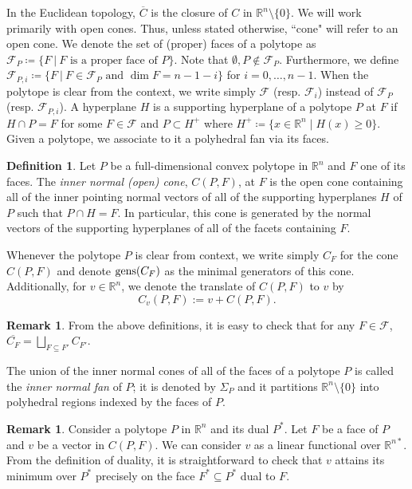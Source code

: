 \documentclass{article}
\numberwithin{theorem}{section}
\theoremstyle{definition}
\newtheorem{definition}[theorem]{Definition}
\newtheorem{remark}[theorem]{Remark}
\theoremstyle{example_contd}
\newcommand{\F}{\mathcal{F}}
\newcommand{\RR}{\mathbb{R}}
\newcommand{\Rd}{\mathbb{R}^{n*}}
\begin{document}
	In the Euclidean topology, $\overline{C}$ is the closure of $C$ in $\RR^n\setminus \{0\}$. 
    We will work primarily with open cones. Thus, unless stated otherwise, ``cone" will refer to an open cone.
    We denote the set of (proper) faces of a polytope as $\F_P\coloneqq \{F~|~ F \text{ is a proper face of }P\}$. Note that $\emptyset, P \notin \F_P$. Furthermore, we define $\F_{P,i}\coloneqq \{F~|~ F \in \F_P \text{ and } \dim F= n-1-i\}$ for $i=0,\ldots,n-1$. When the polytope is clear from the context, we write simply $\F$ (resp. $\F_{i}$) instead of $\F_P$ (resp. $\F_{P,i}$). 
	A hyperplane $H$ is a supporting hyperplane of a polytope $P$ at $F$ if 
	$H\cap P=F$ for some $F\in \mathcal{F}$ and $P\subset H^{+}$ where $H^+\coloneqq \{x \in\RR^n \mid H(x)\geq 0 \}.$ 
	Given a polytope, we associate to it a polyhedral fan via its faces.	
	\begin{definition}
		Let $P$ be a full-dimensional convex polytope in $\RR^n$ and $F$ one of its faces. The \emph{inner normal (open) cone}, $C(P,F)$, at $F$ is the open cone containing all of the inner pointing normal vectors of all of the supporting hyperplanes $H$ of $P$ 
			such that $P\cap H= F$. In particular, this cone is generated by the normal vectors of the supporting hyperplanes of all of the facets containing $F.$%
	\end{definition}
	
	
	
		Whenever the polytope $P$ is clear from context, we write simply $C_F$ for the cone $C(P,F)$ and denote ${\rm gens}(C_F)$ as the minimal generators of this cone. Additionally, for $v\in\RR^n$, we denote the translate of $C(P,F)$ to $v$ by $$C_v(P,F):=v+C(P,F).$$
	
	\begin{remark}\label{rem:coneclosure}
		From the above definitions, it is easy to check that for any $F\in \F$, $\overline{C_F}=\bigsqcup_{F\subseteq F'}C_{F'}.$
	\end{remark}
	
	The union of the inner normal cones of all of the faces of a polytope $P$ is called the \emph{inner normal fan} of $P$; it is denoted by $\Sigma_P$ and it partitions $\RR^n\setminus \{0\}$ into polyhedral regions indexed by the faces of $P$.
	
	
	
	
	\begin{remark}\label{rem:normalcone}
		Consider a polytope $P$ in $\RR^n$ and its dual $P^*$. Let $F$ be a face of $P$ and $v$ be a vector in $C(P,F)$. We can consider $v$ as a linear functional over $\Rd$. 
        From the definition of duality, it is straightforward to check that $v$ attains its minimum over $P^*$ precisely on the face $F^* \subseteq P^*$ dual to $F$.
	\end{remark}
	
\end{document}
